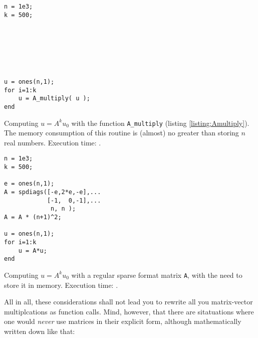 \hfill
\begin{minipage}[t]{.45\textwidth}
\begin{lstlisting}[framerule=1pt]
n = 1e3;
k = 500;







u = ones(n,1);
for i=1:k
    u = A_multiply( u );
end
\end{lstlisting}
Computing $u = A^ku_0$ with the function \lstinline!A_multiply! (listing \ref{listing:Amultiply}). The memory consumption of this routine is (almost) no greater than storing $n$ real numbers. Execution time: .
\end{minipage}
\hfill
\begin{minipage}[t]{.45\textwidth}
\begin{lstlisting}[framerule=1pt]
n = 1e3;
k = 500;

e = ones(n,1);
A = spdiags([-e,2*e,-e],...
            [-1,  0,-1],...
             n, n );
A = A * (n+1)^2;

u = ones(n,1);
for i=1:k
    u = A*u;
end
\end{lstlisting}
Computing $u = A^ku_0$ with a regular sparse format matrix \lstinline!A!, with the need to store it in memory. Execution time: .
\end{minipage}
\hfill

All in all, these considerations shall not lead you to rewrite all you matrix-vector multiplcations as function calls. Mind, however, that there are sitatuations where one would \emph{never} use matrices in their explicit form, although mathematically written down like that:

